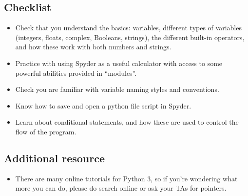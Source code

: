\documentclass[11pt]{report}
\begin{document}
\subsection*{Checklist}
\begin{itemize}

	\item Check that you understand the basics: variables, different types of variables (integers, floats, complex, Booleans, strings), the different built-in operators, and how these work with both numbers and strings.
	\item Practice with using Spyder as a useful calculator with access to some powerful abilities provided in ``modules''.
    \item Check you are familiar with variable naming styles and conventions.
    \item Know how to save and open a python file script in Spyder.
    \item Learn about conditional statements, and how these are used to control the flow of the program.
\end{itemize}

\subsection*{Additional resource}
\begin{itemize}
	\item There are many online tutorials for Python 3, so if you're wondering what more you can do, please do search online or ask your TAs for pointers.
\end{itemize}
\end{document}
